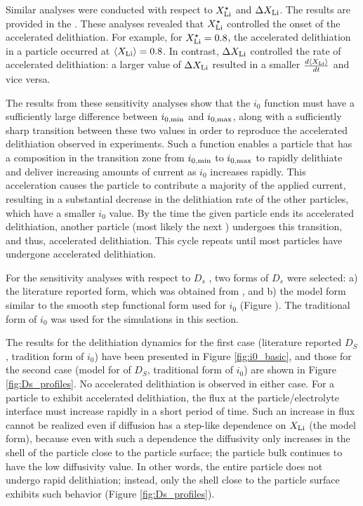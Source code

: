 \documentclass{article}
\begin{document}
Similar analyses were conducted with respect to $X_{\rm{Li}}^{\star}$
and $\Delta X_{\rm{Li}}$. The results are provided in the . These
analyses revealed that $X_{\rm{Li}}^{\star}$ controlled the onset of
the accelerated delithiation. For example, for $X_{\rm{Li}}^{\star} =
0.8$, the accelerated delithiation in a particle occurred at
$\left<X_{\rm{Li}}\right> = 0.8$. In contrast, $\Delta X_{\rm{Li}}$
controlled the rate of accelerated delithiation: a larger value of
$\Delta X_{\rm{Li}}$ resulted in a smaller
$\frac{d\left<X_{\rm{Li}}\right>}{dt}$ and vice versa.

The results from these sensitivity analyses show that the $i_0$
function must have a sufficiently large difference between
$i_{0,\rm{min}}$ and $i_{0,\rm{max}}$, along with a sufficiently sharp
transition between these two values in order to reproduce the
accelerated delithiation observed in experiments. Such a function
enables a particle that has a composition in the transition zone from
$i_{0,\rm{min}}$ to $i_{0,\rm{max}}$ to rapidly delithiate and deliver
increasing amounts of current as $i_0$ increases rapidly. This
acceleration causes the particle to contribute a majority of the
applied current, resulting in a substantial decrease in the
delithiation rate of the other particles, which have a smaller $i_0$
value. By the time the given particle ends its accelerated
delithiation, another particle (most likely the next ) undergoes this transition, and thus, accelerated
delithiation. This cycle repeats until most particles have undergone
accelerated delithiation.


For the sensitivity analyses with respect to $D_s$ , two forms of
$D_s$ were selected: a) the literature reported form, which was
obtained from , and b) the model form similar to
the smooth step functional form used for $i_0$ (Figure ). The traditional form of $i_0$ was used for the simulations in
this section.

The results for the delithiation dynamics for the first case
(literature reported $D_S$, tradition form of $i_0$) have been
presented in Figure \ref{fig:i0_basic}, and those for the second case
(model for of $D_S$, traditional form of $i_0$) are shown in Figure
\ref{fig:Ds_profiles}. No accelerated delithiation is observed in
either case. For a particle to exhibit accelerated delithiation, the
 flux at the particle/electrolyte interface must increase
rapidly in a short period of time. Such an increase in flux cannot be
realized even if diffusion has a step-like dependence on $X_{\rm{Li}}$
(the model form), because even with such a dependence the diffusivity
only increases in the shell of the particle close to the particle
surface; the particle bulk continues to have the low diffusivity
value. In other words, the entire particle does not undergo rapid
delithiation; instead, only the shell close to the particle surface
exhibits such behavior (Figure \ref{fig:Ds_profiles}).
\end{document}
